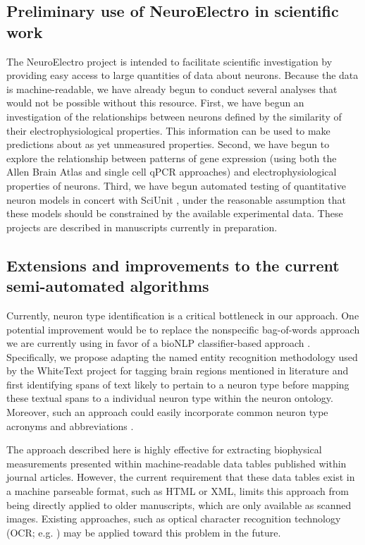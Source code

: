 \documentclass{template/frontiersSCNS} %
\begin{document}
\subsection{Preliminary use of NeuroElectro in scientific work}
The NeuroElectro project is intended to facilitate scientific investigation by providing easy access to large quantities of data about neurons.  
Because the data is machine-readable, we have already begun to conduct several analyses that would not be possible without this resource.  
First, we have begun an investigation of the relationships between neurons defined by the similarity of their electrophysiological properties.  
This information can be used to make predictions about as yet unmeasured properties.  
Second, we have begun to explore the relationship between patterns of gene expression (using both the Allen Brain Atlas \citep{lein_genome-wide_2007} and single cell qPCR approaches) and electrophysiological properties of neurons.  
Third, we have begun automated testing of quantitative neuron models in concert with SciUnit \citep{omar_sciunit_2014}, under the reasonable assumption that these models should be constrained by the available experimental data.  
These projects are described in manuscripts currently in preparation.  

\subsection{Extensions and improvements to the current semi-automated algorithms}
Currently, neuron type identification is a critical bottleneck in our approach.  
One potential improvement would be to replace the nonspecific bag-of-words approach we are currently using in favor of a bioNLP classifier-based approach \citep{mccallum_mallet:_2002}.  
Specifically, we propose adapting the named entity recognition methodology used by the WhiteText project for tagging brain regions mentioned in literature \citep{french_automated_2009,french_using_2012} and first identifying spans of text likely to pertain to a neuron type before mapping these textual spans to a individual neuron type within the neuron ontology.  
Moreover, such an approach could easily incorporate common neuron type acronyms and abbreviations \citep{okazaki_building_2006}.

The approach described here is highly effective for extracting biophysical measurements presented within machine-readable data tables published within journal articles.  
However, the current requirement that these data tables exist in a machine parseable format, such as HTML or XML, limits this approach from being directly applied to older manuscripts, which are only available as scanned images.  
Existing approaches, such as optical character recognition technology (OCR; e.g. \citep{ramakrishnan_layout-aware_2012}) may be applied toward this problem in the future. 
\end{document}
